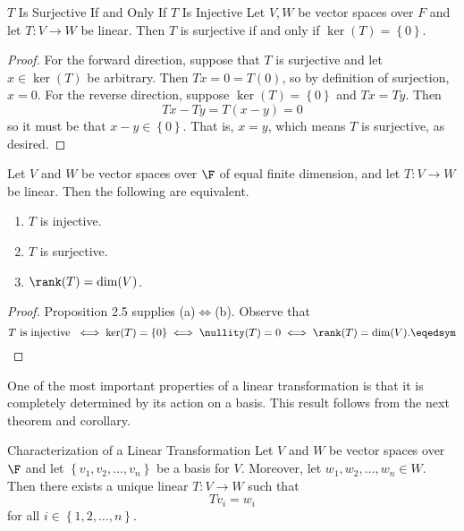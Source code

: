 \documentclass[linearalgebra]{subfiles}
\begin{document}
    \begin{prop}{$T$ Is Surjective If and Only If $T$ Is Injective}
        Let $V, W$ be vector spaces over $F$ and let $T: V\to W$ be linear. Then $T$ is surjective if and only if $\ker(T) = \left\lbrace 0 \right\rbrace$.
    \end{prop}

    \begin{proof}
        For the forward direction, suppose that $T$ is surjective and let $x\in \ker(T)$ be arbitrary. Then $Tx = 0 = T(0)$, so by definition of surjection, $x=0$. For the reverse direction, suppose $\ker(T) = \left\lbrace 0 \right\rbrace$ and $Tx = Ty$. Then
        \begin{equation*}
            Tx - Ty = T(x-y) = 0
        \end{equation*}
        so it must be that $x-y\in \left\lbrace 0 \right\rbrace$. That is, $x = y$, which means $T$ is surjective, as desired.
    \end{proof}

    \clearpage
    \begin{prop}{}
        Let $V$ and $W$ be vector spaces over $\F$ of equal finite dimension, and let $T: V\to W$ be linear. Then the following are equivalent.
        \begin{enumerate}
            \item $T$ is injective.
            \item $T$ is surjective.
            \item $\rank(T)=\dim(V)$.
        \end{enumerate}
    \end{prop}

    \begin{proof}
        Proposition 2.5 supplies (a)$\iff$(b). Observe that
        \begin{equation*}
            T\text{ is injective } \iff \ker(T)=\left\lbrace 0 \right\rbrace \iff \nullity(T)=0\iff\rank(T)=\dim(V). \eqedsym
        \end{equation*}
    \end{proof}

    \begin{remark}
        One of the most important properties of a linear transformation is that it is completely determined by its action on a basis. This result follows from the next theorem and corollary.
    \end{remark}

    \begin{theorem}{Characterization of a Linear Transformation}
        Let $V$ and $W$ be vector spaces over $\F$ and let $\left\lbrace v_1, v_2, \ldots, v_n \right\rbrace$ be a basis for $V$. Moreover, let $w_1, w_2, \ldots, w_n\in W$. Then there exists a unique linear $T: V\to W$ such that
        \begin{equation*}
            Tv_i = w_i
        \end{equation*}
        for all $i\in\left\lbrace 1,2,\ldots,n \right\rbrace$.
    \end{theorem}
\end{document}
